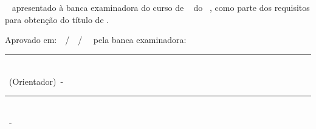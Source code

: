 
%    


\begin{folhadeaprovacao}

\begin{center}
    \large { \imprimirautor}  \\
		\vspace{3cm} 
		\large {\textbf{\MakeTextUppercase{\imprimirtitulo}}~\MakeTextLowercase{\imprimirsubtitulo}}
    \end{center}
    \vspace{2cm}
    \begin{flushright} 
    \parbox{0.6\linewidth}{
		\imprimirtipotrabalho~ apresentado à banca examinadora do curso de \imprimircurso~ do \imprimirinstituicao~\imprimirinstituto, como parte dos requisitos para obtenção do título de \imprimirgrau. \\
		}
   \end{flushright} 
   \vfill
 
   \begin{center}
   \large{
   Aprovado em:~\imprimirdia~/\ \imprimirmes~/\ \imprimirano~ pela banca examinadora:
    \vspace{2cm}
    \vfill
          \rule{15cm}{.1pt} \\
      {\imprimirorientador}~(Orientador)~-~{\imprimirttorientador} 
      \vfill
			 \vfill
      \rule{15cm}{.1pt} \\
      {\imprimirexaminadorum}~-~{\imprimirttexaminadorum} %
        \vfill
        \ifdefvoid{\imprimirexaminadordois}{}{
        \rule{15cm}{.1pt} \\
        \imprimirexaminadordois~-~\imprimirttexaminadordois %
        }
				\vfill
        \ifdefvoid{\imprimirexaminadortres}{}{
        \rule{15cm}{.1pt} \\
        \imprimirexaminadortres~-~\imprimirttexaminadortres %
        }
				\vfill
        \ifdefvoid{\imprimirexaminadorquatro}{}{
        \rule{15cm}{.1pt} \\
        \imprimirexaminadorquatro~-~\imprimirttexaminadorquatro %
        }
   
}
\end{center}
\end{folhadeaprovacao}
